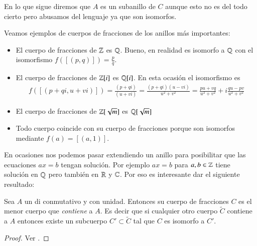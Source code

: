 En lo que sigue diremos que $A$ es un subanillo de $C$ aunque esto no es del todo cierto pero abusamos del lenguaje ya que son isomorfos.

\begin{ej}
	Veamos ejemplos de cuerpos de fracciones de los anillos más importantes:
	\begin{itemize}
		\item El cuerpo de fracciones de $\mathbb{Z}$ es $\mathbb{Q}$. Bueno, en realidad es isomorfo a $\mathbb{Q}$ con el isomorfismo $f([(p,q)]) = \frac{p}{q}$.
		\item El cuerpo de fracciones de $\mathbb{Z}[i]$ es $\mathbb{Q}[i]$. En esta ocasión el isomorfismo es
		\begin{align*}
			f([(p+qi, u+vi)]) = \frac{(p+qi)}{(u+vi)} = \frac{(p+qi)(u-vi)}{u^2+v^2} = \frac{pu+vq}{u^2+v^2} + i\frac{qu-pv}{u^2+v^2}
		\end{align*}
		\item El cuerpo de fracciones de $\mathbb{Z}[\sqrt{m}]$ es $\mathbb{Q}[\sqrt{m}]$
		\item Todo cuerpo coincide con su cuerpo de fracciones porque son isomorfos mediante $f(a) = [(a,1)]$.
	\end{itemize}
\end{ej}

En ocasiones nos podemos pasar extendiendo un anillo para posibilitar que las ecuaciones $ax=b$ tengan solución. Por ejemplo $ax=b$ para $a,b \in \mathbb{Z}$ tiene solución en $\mathbb{Q}$ pero también en $\mathbb{R}$ y $\mathbb{C}$. Por eso es interesante dar el siguiente resultado:

\begin{pro}
	Sea $A$ un \gls{di} conmutativo y con unidad. Entonces su cuerpo de fracciones $C$ es el menor cuerpo que \textit{contiene} a $A$. Es decir que  si cualquier otro cuerpo $\tilde{C}$ contiene a $A$ entonces existe un subcuerpo $C' \subset \tilde{C}$ tal que $C$ es isomorfo a $C'$.
\end{pro}

\begin{proof}
	Ver \cite[p.210]{dor96}.
\end{proof}